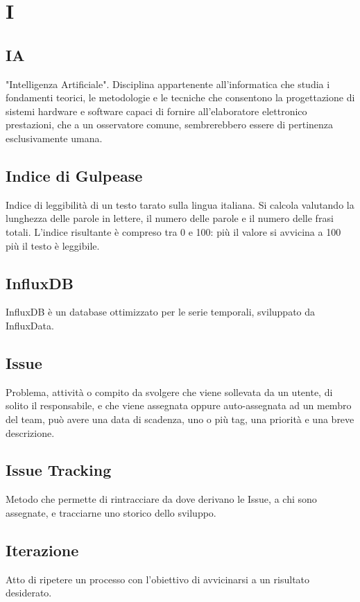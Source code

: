 \section*{I}

\subsection{IA}
"Intelligenza Artificiale". Disciplina appartenente all'informatica che studia i fondamenti teorici, le metodologie e le tecniche che consentono la progettazione di sistemi hardware e software
capaci di fornire all'elaboratore elettronico prestazioni, che a un osservatore comune, sembrerebbero essere di pertinenza esclusivamente umana. 

\subsection{Indice di Gulpease}
Indice di leggibilità di un testo tarato sulla lingua italiana. Si calcola valutando la lunghezza delle parole in lettere, il numero delle parole e il numero delle frasi totali. L'indice risultante è compreso tra 0 e 100: più il valore si avvicina a 100 più il testo è leggibile.

\subsection{InfluxDB}
InfluxDB è un database ottimizzato per le serie temporali, sviluppato da InfluxData.

\subsection{Issue}
Problema, attività o compito da svolgere che viene sollevata da un utente, di solito il responsabile, e che viene assegnata oppure auto-assegnata ad un membro del team, può avere una data di scadenza, uno o più tag, una priorità e una breve descrizione.

\subsection{Issue Tracking}
Metodo che permette di rintracciare da dove derivano le Issue, a chi sono assegnate, e tracciarne uno storico dello sviluppo.

\subsection{Iterazione}
Atto di ripetere un processo con l'obiettivo di avvicinarsi a un risultato desiderato.

